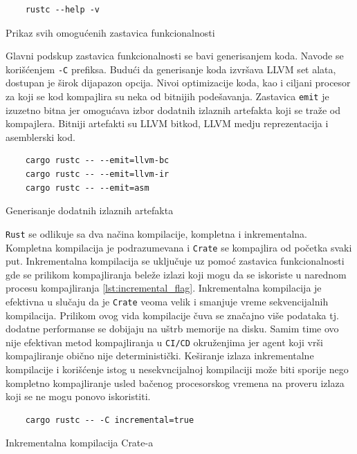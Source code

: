 \documentclass[11pt]{article}
\begin{document}
\begin{listing}[H]
\begin{verbatim}
    rustc --help -v 
\end{verbatim}
\caption{Prikaz svih omogućenih zastavica funkcionalnosti}
\label{lst:rustc_flags}
\end{listing}

Glavni podskup zastavica funkcionalnosti se bavi generisanjem koda. Navode se korišćenjem \verb|-C| prefiksa. 
Budući da generisanje koda izvršava 
LLVM set alata, dostupan je širok dijapazon opcija. Nivoi optimizacije koda, kao i ciljani procesor za koji 
se kod kompajlira su neka od bitnijih podešavanja. Zastavica \verb|emit| je izuzetno bitna jer omogućava izbor 
dodatnih izlaznih artefakta koji se traže od kompajlera. Bitniji artefakti su LLVM bitkod, LLVM medju 
reprezentacija i asemblerski kod.

\begin{listing}[H]
\begin{verbatim}
    cargo rustc -- --emit=llvm-bc
    cargo rustc -- --emit=llvm-ir
    cargo rustc -- --emit=asm
\end{verbatim}
\caption{Generisanje dodatnih izlaznih artefakta}
\label{lst:emit_flag}
\end{listing}


\verb|Rust| se odlikuje sa dva načina kompilacije, kompletna 
i inkrementalna. Kompletna kompilacija je podrazumevana i \verb|Crate| se kompajlira od početka svaki put.
Inkrementalna kompilacija se uključuje uz pomoć zastavica funkcionalnosti gde se prilikom kompajliranja 
beleže izlazi koji mogu da se iskoriste u narednom procesu kompajliranja \ref{lst:incremental_flag}. Inkrementalna kompilacija je 
efektivna u slučaju da je \verb|Crate| veoma velik i smanjuje vreme sekvencijalnih kompilacija. Prilikom ovog 
vida kompilacije čuva se značajno više podataka tj. dodatne performanse se dobijaju na uštrb memorije na disku.
Samim time ovo nije efektivan metod kompajliranja u \verb|CI/CD| okruženjima jer agent koji vrši kompajliranje
obično nije deterministički. Keširanje izlaza inkrementalne kompilacije i korišćenje istog u nesekvncijalnoj 
kompilaciji može biti sporije nego kompletno kompajliranje usled bačenog procesorskog vremena na proveru 
izlaza koji se ne mogu ponovo iskoristiti.

\begin{listing}[H]
\begin{verbatim}
    cargo rustc -- -C incremental=true 
\end{verbatim}
\caption{Inkrementalna kompilacija Crate-a}
\label{lst:incremental_flag}
\end{listing}
\end{document}

